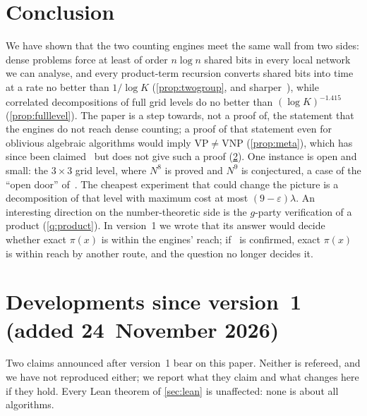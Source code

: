 \documentclass[10pt]{amsart}
\theoremstyle{plain}
\theoremstyle{definition}
\theoremstyle{remark}
\numberwithin{equation}{section}
\begin{document}
\section{Conclusion}\label{sec:conclusion}
We have shown that the two counting engines meet the same wall from two sides: dense problems force
at least of order $n\log n$ shared bits in every local network we can analyse, and every product-term
recursion converts shared bits into time at a rate no better than $1/\log K$ (\cref{prop:twogroup}, and
sharper~\cite[Theorem~4.13]{Maj26}), while correlated decompositions of full grid levels do no better
than $(\log K)^{-1.415}$ (\cref{prop:fulllevel}). The paper is a step towards, not a
proof of, the statement that the engines do not reach dense counting; a proof of that statement even
for oblivious algebraic algorithms would imply $\mathrm{VP}\ne\mathrm{VNP}$ (\cref{prop:meta}),
which has since been claimed~\cite{AnthropicVP26} but does not give such a proof (\cref{sec:v2}). One instance is open and small: the
$3\times3$ grid level, where $N^8$ is proved and $N^9$ is conjectured, a case of the ``open door''
of~\cite[\S4.8]{Maj26}. The cheapest experiment that could
change the picture is a decomposition of that level with maximum cost at most $(9-\varepsilon)\lambda$. An
interesting direction on the number-theoretic side is the $g$-party verification of a product
(\cref{q:product}). In version~1 we wrote that its answer would decide whether exact $\pi(x)$ is
within the engines' reach; if~\cite{Ni26} is confirmed, exact $\pi(x)$ is within reach by another
route, and the question no longer decides it.

\section{Developments since version~1 (added 24~November 2026)}\label{sec:v2}

Two claims announced after version~1 bear on this paper. Neither is refereed, and we have not
reproduced either; we report what they claim and what changes here if they hold. Every Lean theorem
of \cref{sec:lean} is unaffected: none is about all algorithms.
\end{document}
